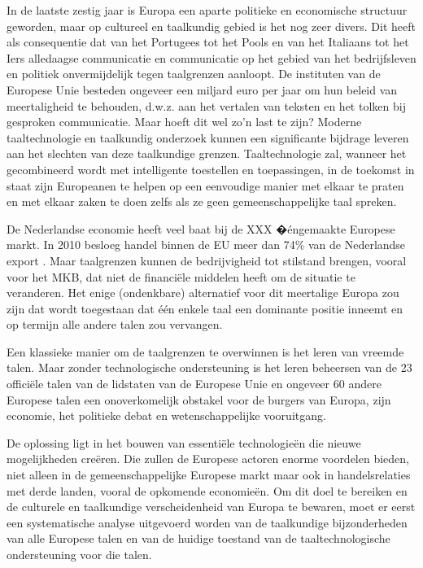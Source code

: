 \documentclass[]{../../metanetpaper}
\begin{document}
\begin{multicols}{2}

    In de laatste zestig jaar is Europa een aparte politieke en economische structuur geworden, maar op cultureel en taalkundig gebied is het nog zeer divers. Dit heeft als consequentie dat van het Portugees tot het Pools en van het Italiaans tot het Iers alledaagse communicatie en communicatie op het gebied van het bedrijfsleven en politiek onvermijdelijk tegen taalgrenzen aanloopt. De instituten van de Europese Unie besteden ongeveer een miljard euro per jaar om hun beleid van meertaligheid te behouden, d.w.z. aan het vertalen van teksten en het tolken bij gesproken communicatie. Maar hoeft dit wel zo'n last te zijn? Moderne taaltechnologie en taalkundig onderzoek kunnen een significante bijdrage leveren aan het slechten van deze taalkundige grenzen. Taaltechnologie zal, wanneer het gecombineerd wordt met intelligente toestellen en toepassingen, in de toekomst in staat zijn Europeanen te helpen op een eenvoudige manier met elkaar te praten en met elkaar zaken te doen zelfs als ze geen gemeenschappelijke taal spreken.
   

    De Nederlandse economie heeft veel baat bij de XXX �{\'e}ngemaakte Europese markt. In 2010 besloeg handel binnen de EU meer dan 74\% van de Nederlandse export \cite{CBSStats}.  Maar taalgrenzen kunnen de bedrijvigheid tot stilstand brengen, vooral voor het MKB, dat niet de financi{\"e}le middelen heeft om de situatie te veranderen. Het enige (ondenkbare) alternatief voor dit meertalige Europa zou zijn dat wordt toegestaan dat {\'e}{\'e}n enkele taal een dominante positie inneemt en op termijn alle andere talen zou vervangen.

    Een klassieke manier om de taalgrenzen te overwinnen is het leren van vreemde talen. Maar zonder technologische ondersteuning is het leren beheersen van de 23 offici{\"e}le talen van de lidstaten van de Europese Unie en ongeveer 60 andere Europese talen een onoverkomelijk obstakel voor de burgers van Europa, zijn economie, het politieke debat en wetenschappelijke vooruitgang.

    De oplossing ligt in het bouwen van essenti{\"e}le technologie{\"e}n die nieuwe mogelijkheden cre{\"e}ren. Die zullen de Europese actoren enorme voordelen bieden, niet alleen in de gemeenschappelijke Europese markt maar ook in handelsrelaties met derde landen, vooral de opkomende economie{\"e}n. Om dit doel te bereiken en de culturele en taalkundige verscheidenheid van Europa te bewaren, moet er eerst een systematische analyse uitgevoerd worden van de taalkundige bijzonderheden van alle Europese talen en van de huidige toestand van de taaltechnologische ondersteuning voor die talen.


\end{multicols}
\end{document}
